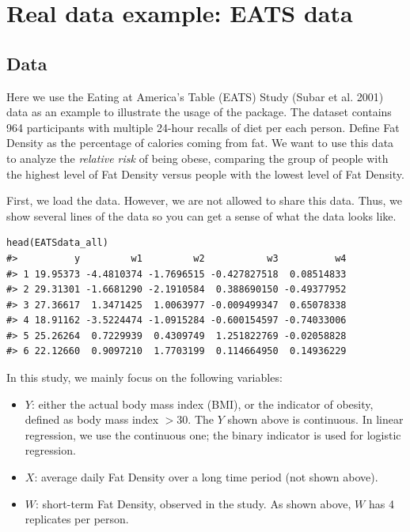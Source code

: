 \documentclass[15 pt,]{article}
\begin{document}
\section{Real data example: EATS
data}\label{real-data-example-eats-data}

\subsection{Data}\label{data}

Here we use the Eating at America's Table (EATS) Study (Subar et al.
2001) data as an example to illustrate the usage of the package. The
dataset contains 964 participants with multiple 24-hour recalls of diet
per each person. Define Fat Density as the percentage of calories coming
from fat. We want to use this data to analyze the \emph{relative risk}
of being obese, comparing the group of people with the highest level of
Fat Density versus people with the lowest level of Fat Density.

First, we load the data. However, we are not allowed to share this data.
Thus, we show several lines of the data so you can get a sense of what
the data looks like.

\begin{verbatim}
head(EATSdata_all)
#>          y         w1         w2           w3          w4
#> 1 19.95373 -4.4810374 -1.7696515 -0.427827518  0.08514833
#> 2 29.31301 -1.6681290 -2.1910584  0.388690150 -0.49377952
#> 3 27.36617  1.3471425  1.0063977 -0.009499347  0.65078338
#> 4 18.91162 -3.5224474 -1.0915284 -0.600154597 -0.74033006
#> 5 25.26264  0.7229939  0.4309749  1.251822769 -0.02058828
#> 6 22.12660  0.9097210  1.7703199  0.114664950  0.14936229
\end{verbatim}

In this study, we mainly focus on the following variables:

\begin{itemize}
\item
  \(Y\): either the actual body mass index (BMI), or the indicator of
  obesity, defined as body mass index \(> 30\). The \(Y\) shown above is
  continuous. In linear regression, we use the continuous one; the
  binary indicator is used for logistic regression.
\item
  \(X\): average daily Fat Density over a long time period (not shown
  above).
\item
  \(W\): short-term Fat Density, observed in the study. As shown above,
  \(W\) has 4 replicates per person.
\end{itemize}
\end{document}
